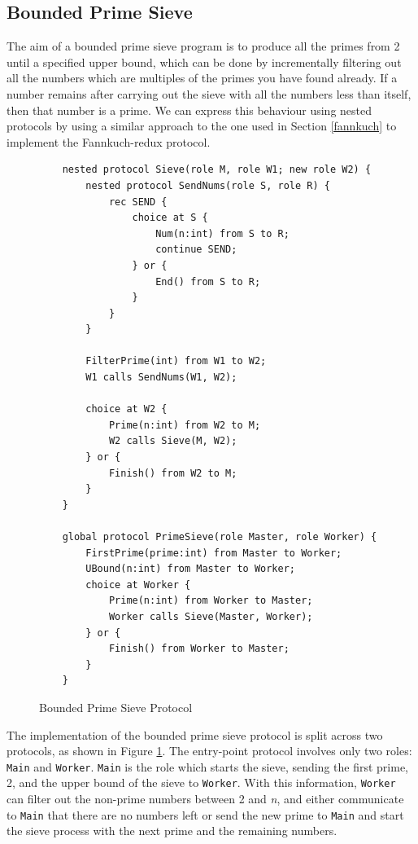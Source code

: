 \documentclass[12pt,twoside]{report}
\begin{document}
\subsection{Bounded Prime Sieve}\label{primesieve}
The aim of a bounded prime sieve program is to produce all the primes from 2 until a specified upper bound, which can be done by incrementally filtering out all the numbers which are multiples of the primes you have found already. If a number remains after carrying out the sieve with all the numbers less than itself, then that number is a prime. We can express this behaviour using nested protocols by using a similar approach to the one used in Section \ref{fannkuch} to implement the Fannkuch-redux protocol.\\


\begin{figure}[htb!]
    \centering
    \lstset{language=Scribble}
    \begin{lstlisting}
    nested protocol Sieve(role M, role W1; new role W2) {
        nested protocol SendNums(role S, role R) {
            rec SEND {
                choice at S {
                    Num(n:int) from S to R;
                    continue SEND;
                } or {
                    End() from S to R;
                }
            }
        }
    
        FilterPrime(int) from W1 to W2;
        W1 calls SendNums(W1, W2);
    
        choice at W2 {
            Prime(n:int) from W2 to M;
            W2 calls Sieve(M, W2);
        } or {
            Finish() from W2 to M;
        }
    }
    
    global protocol PrimeSieve(role Master, role Worker) {
        FirstPrime(prime:int) from Master to Worker;
        UBound(n:int) from Master to Worker;
        choice at Worker {
            Prime(n:int) from Worker to Master;
            Worker calls Sieve(Master, Worker);
        } or {
            Finish() from Worker to Master;
        }
    }
    \end{lstlisting}
    \caption{Bounded Prime Sieve Protocol}
    \label{primesieve-protocol}
\end{figure}

The implementation of the bounded prime sieve protocol is split across two protocols, as shown in Figure \ref{primesieve-protocol}. The entry-point protocol involves only two roles: \texttt{Main} and \texttt{Worker}. \texttt{Main} is the role which starts the sieve, sending the first prime, 2,  and the upper bound of the sieve to \texttt{Worker}. With this information, \texttt{Worker} can filter out the non-prime numbers between 2 and \textit{n}, and either communicate to \texttt{Main} that there are no numbers left or send the new prime to \texttt{Main} and start the sieve process with the next prime and the remaining numbers. \\
\end{document}
